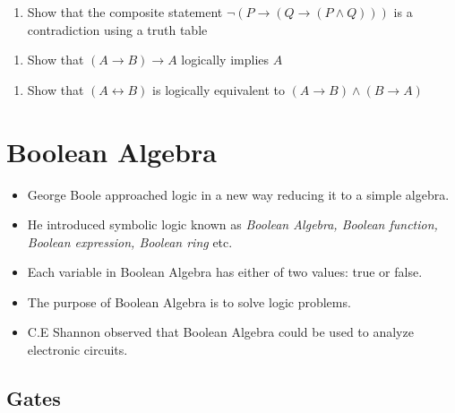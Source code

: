 \documentclass[]{book}
\providecommand{\tightlist}{%
  \setlength{\itemsep}{0pt}\setlength{\parskip}{0pt}}
\begin{document}
\begin{enumerate}
\def\labelenumi{\arabic{enumi}.}
\setcounter{enumi}{2}
\tightlist
\item
  Show that the composite statement \(\lnot (P \rightarrow( Q \rightarrow (P \land Q)))\) is a contradiction using a truth table
\end{enumerate}

\begin{enumerate}
\def\labelenumi{\arabic{enumi}.}
\setcounter{enumi}{3}
\tightlist
\item
  Show that \((A \rightarrow B) \rightarrow A\)
  logically implies \(A\)
\end{enumerate}

\begin{enumerate}
\def\labelenumi{\arabic{enumi}.}
\setcounter{enumi}{4}
\tightlist
\item
  Show that \((A \leftrightarrow B)\) is
  logically equivalent to \((A \rightarrow B) \land (B \rightarrow A)\)
\end{enumerate}

\hypertarget{boolean-algebra}{%
\chapter{Boolean Algebra}\label{boolean-algebra}}

\begin{itemize}
\tightlist
\item
  George Boole approached logic in a new way reducing it to a simple algebra.
\item
  He introduced symbolic logic known as \emph{Boolean Algebra, Boolean function, Boolean expression, Boolean ring} etc.
\item
  Each variable in Boolean Algebra has either of two values: true or false.
\item
  The purpose of Boolean Algebra is to solve logic problems.
\item
  C.E Shannon observed that Boolean Algebra could be used to analyze electronic circuits.
\end{itemize}

\hypertarget{gates}{%
\section{Gates}\label{gates}}
\end{document}
